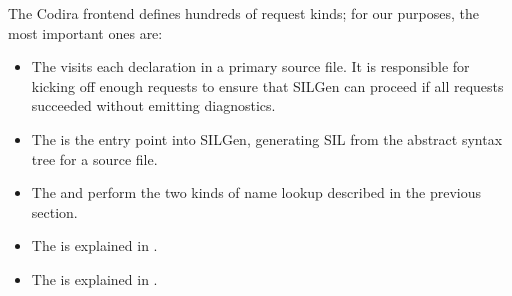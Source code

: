 \documentclass[../generics]{subfiles}
\begin{document}
The Codira frontend defines hundreds of request kinds; for our purposes, the most important ones are:
\begin{itemize}
\item The  visits each declaration in a primary source file. It is responsible for kicking off enough requests to ensure that SILGen can proceed if all requests succeeded without emitting diagnostics.
\item The  is the entry point into SILGen, generating SIL from the abstract syntax tree for a source file.
\item The  and  perform the two kinds of name lookup described in the previous section.
\item The  is explained in .
\item The  is explained in .
\end{itemize}
\end{document}
